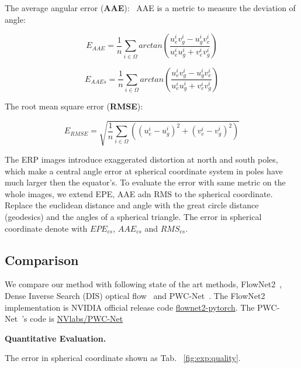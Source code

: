 The average angular error (\textbf{AAE}):~\cite{??}
AAE is a metric to measure the deviation of angle:

\begin{equation}\label{equ_exp_aae}
	E_{AAE} = \frac{1}{n} \sum_{i \in \Omega}arctan(\frac{u^i_e v^i_g - u^i_g v^i_e}{u^i_e u^i_g + v^i_e v^i_g})
\end{equation}

\begin{equation}\label{equ_exp_aae_sp}
	E_{AAEs} = \frac{1}{n} \sum_{i \in \Omega}arctan(\frac{u^i_e v^i_g - u^i_g v^i_e}{u^i_e u^i_g + v^i_e v^i_g})
\end{equation}

The root mean square error (\textbf{RMSE}):~\cite{??}


\begin{equation}\label{equ_exp_rmse}
	E_{RMSE} = \sqrt{\frac{1}{n} \sum_{i \in \Omega}((u_e^i - u_g^i)^2 + (v_e^i - v_g^i)^2)}
\end{equation}

The ERP images introduce exaggerated distortion at north and south poles, which make a central angle error at spherical coordinate system in poles have much larger then the equator's.
To evaluate the error with same metric on the whole images, we extend EPE, AAE adn RMS to the spherical coordinate. 
Replace the euclidean distance and angle with the great circle distance (geodesics) and the angles of a spherical triangle. 
The error in spherical coordinate denote with $EPE_{cs}$, $AAE_{cs}$ and $RMS_{cs}$.

\subsection{Comparison}

We compare our method with following state of the art methods, FlowNet2~\cite{ilg2017flownet}, Dense Inverse Search (DIS) optical flow~\cite{kroeger2016fast} and PWC-Net~\cite{sun2018pwc}. 
The FlowNet2~\cite{ilg2017flownet} implementation is NVIDIA official release code \href{https://github.com/NVIDIA/flownet2-pytorch}{flownet2-pytorch}.
The PWC-Net~\cite{sun2018pwc}'s code is \href{https://github.com/NVlabs/PWC-Net}{NVlabs/PWC-Net}


\textbf{Quantitative  Evaluation.}


The error in spherical coordinate shown as Tab. ~\ref{fig:exp:quality}.

